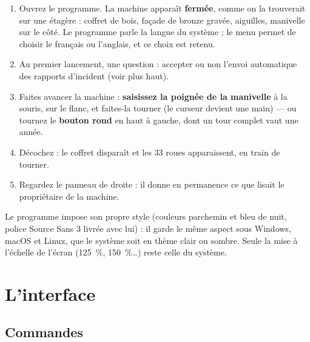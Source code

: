 \begin{enumerate}
  \item Ouvrez le programme. La machine apparaît \textbf{fermée}, comme on la trouverait sur
        une étagère : coffret de bois, façade de bronze gravée, aiguilles, manivelle sur le
        côté. Le programme parle la langue du système ; le menu  permet de
        choisir le français ou l'anglais, et ce choix est retenu.
  \item Au premier lancement, une question : accepter ou non l'envoi automatique des
        rapports d'incident (voir plus haut).
  \item Faites avancer la machine : \textbf{saisissez la poignée de la manivelle} à la
        souris, sur le flanc, et faites-la tourner (le curseur devient une main) — ou tournez
        le \textbf{bouton rond} en haut à gauche, dont un tour complet vaut une année.
  \item Décochez  : le coffret disparaît et les 33 roues apparaissent, en
        train de tourner.
  \item Regardez le panneau de droite : il donne en permanence ce que lisait le propriétaire
        de la machine.
\end{enumerate}


\begin{astuce}
Le programme impose son propre style (couleurs parchemin et bleu de nuit, police Source
Sans 3 livrée avec lui) : il garde le même aspect sous Windows, macOS et Linux, que le
système soit en thème clair ou sombre. Seule la mise à l'échelle de l'écran (125~\%,
150~\%…) reste celle du système.
\end{astuce}

\section{L'interface}

\subsection{Commandes}

